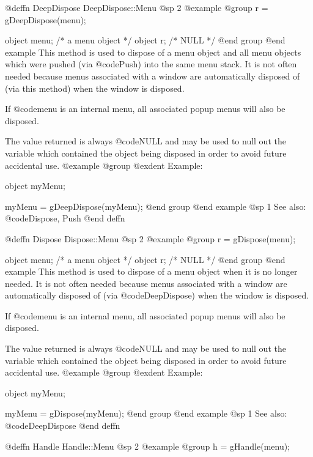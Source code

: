 @deffn {DeepDispose} DeepDispose::Menu
@sp 2
@example
@group
r = gDeepDispose(menu);

object  menu;   /*  a menu object    */
object  r;      /*  NULL             */
@end group
@end example
This method is used to dispose of a menu object and all menu objects
which were pushed (via @code{Push}) into the same menu stack.  It is not
often needed because menus associated with a window are automatically
disposed of (via this method) when the window is disposed.

If @code{menu} is an internal menu, all associated popup menus will
also be disposed.

The value returned is always @code{NULL} and may be used to null out
the variable which contained the object being disposed in order to
avoid future accidental use.
@example
@group
@exdent Example:

object  myMenu;

myMenu = gDeepDispose(myMenu);
@end group
@end example
@sp 1
See also:  @code{Dispose, Push}
@end deffn









@deffn {Dispose} Dispose::Menu
@sp 2
@example
@group
r = gDispose(menu);

object  menu;   /*  a menu object   */
object  r;      /*  NULL            */
@end group
@end example
This method is used to dispose of a menu object when it is no longer
needed.  It is not often needed because menus associated with a window
are automatically disposed of (via @code{DeepDispose}) when the window
is disposed.

If @code{menu} is an internal menu, all associated popup menus will
also be disposed.

The value returned is always @code{NULL} and may be used to null out
the variable which contained the object being disposed in order to
avoid future accidental use.
@example
@group
@exdent Example:

object  myMenu;

myMenu = gDispose(myMenu);
@end group
@end example
@sp 1
See also:  @code{DeepDispose}
@end deffn












@deffn {Handle} Handle::Menu
@sp 2
@example
@group
h = gHandle(menu);

